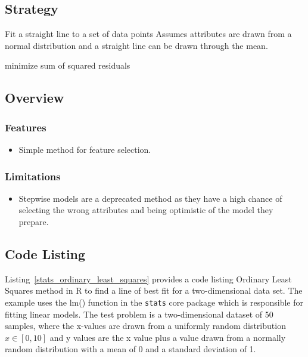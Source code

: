 \subsection{Strategy}

Fit a straight line to a set of data points
Assumes attributes are drawn from a normal distribution and a straight line can be drawn through the mean.

minimize sum of squared residuals


\subsection{Overview}

\subsubsection{Features}

\begin{itemize}
	\item Simple method for feature selection.
\end{itemize}

\subsubsection{Limitations}

\begin{itemize}
	\item Stepwise models are a deprecated method as they have a high chance of selecting the wrong attributes and being optimistic of the model they prepare.
\end{itemize}

\subsection{Code Listing}
Listing~\ref{stats_ordinary_least_squares} provides a code listing Ordinary Least Squares method in R to find a line of best fit for a two-dimensional data set.
The example uses the {lm()} function in the \texttt{stats} core package which is responsible for fitting linear models.
The test problem is a two-dimensional dataset of 50 samples, where the x-values are drawn from a uniformly random distribution $x \in [0,10]$ and y values are the x value plus a value drawn from a normally random distribution with a mean of 0 and a standard deviation of 1.


